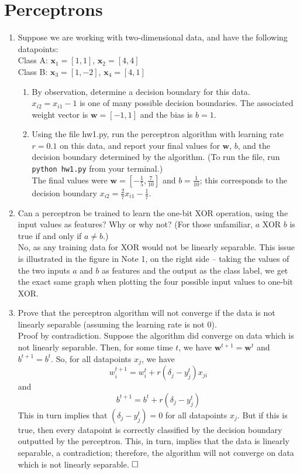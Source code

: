 \documentclass{article}
\begin{document}
\section{Perceptrons}
\begin{enumerate}[label=\arabic*.]
\item Suppose we are working with two-dimensional data, and have the following datapoints: \\
Class A: $\mathbf{x}_1 = [1, 1]$, $\mathbf{x}_2 = [4, 4]$ \\
Class B: $\mathbf{x}_3 = [1, -2]$, $\mathbf{x}_4 = [4, 1]$ 
	  \begin{enumerate}[label=(\alph*)]
	  \item By observation, determine a decision boundary for this data. \\
	  		{\color{blue}$x_{i2} = x_{i1} - 1$ is one of many possible decision boundaries. The associated weight vector is $\mathbf{w} = [-1, 1]$ and the bias is $b = 1$.}
	  \item Using the file hw1.py, run the perceptron algorithm with learning rate $r = 0.1$ on this data, and report your final values for $\mathbf{w}$, $b$, and the decision boundary determined by the algorithm. (To run the file, run \verb|python hw1.py| from your terminal.) \\
	  {\color{blue} The final values were $\mathbf{w} = [-\frac{1}{5}, \frac{7}{10}]$ and $b = \frac{1}{10}$; this corresponds to the decision boundary $x_{i2} = \frac{2}{7}x_{i1} - \frac{1}{7}$.}
	  \end{enumerate}
\item Can a perceptron be trained to learn the one-bit XOR operation, using the input values as features? Why or why not? (For those unfamiliar, $a$ XOR $b$ is true if and only if $a \neq b$.) \\
{\color{blue}No, as any training data for XOR would not be linearly separable. This issue is illustrated in the figure in Note 1, on the right side -- taking the values of the two inputs $a$ and $b$ as features and the output as the class label, we get the exact same graph when plotting the four possible input values to one-bit XOR.}
\item Prove that the perceptron algorithm will not converge if the data is not linearly separable (assuming the learning rate is not 0). \\
{\color{blue}Proof by contradiction. Suppose the algorithm did converge on data which is not linearly separable. Then, for some time $t$, we have $\mathbf{w}^{t+1} = \mathbf{w}^t$ and $b^{t+1} = b^t$. So, for all datapoints $x_j$, we have $$w_i^{t+1} = w_i^t + r(\delta_j - y_j^t)x_{ji}$$ and $$b^{t+1} = b^t + r(\delta_j-y_j^t)$$ This in turn implies that $(\delta_j - y_j^t) = 0$ for all datapoints $x_j$. But if this is true, then every datapoint is correctly classified by the decision boundary outputted by the perceptron. This, in turn, implies that the data is linearly separable, a contradiction; therefore, the algorithm will not converge on data which is not linearly separable. $\hfill\square$}
\end{enumerate}
\end{document}
